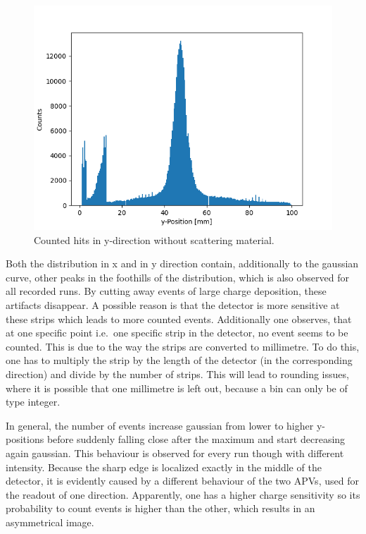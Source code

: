 \documentclass[sn-mathphys-num,iicol]{sn-jnl}
\theoremstyle{thmstyleone}
\theoremstyle{thmstyletwo}
\theoremstyle{thmstylethree}
\begin{document}
\begin{figure}
  \includegraphics[width=0.9\linewidth]{../src/elsa/finished_plots/unfiltered_noMaterial.png}
  \caption{Counted hits in y-direction without scattering material.}
  \label{fig:y_hist_notarget}
\end{figure}

Both the distribution in x and in y direction contain, additionally to the gaussian curve, other peaks in the foothills of the distribution, which is also observed for all recorded runs.
By cutting away events of large charge deposition, these artifacts disappear. 
A possible reason is that the detector is more sensitive at these strips which leads to more counted events.
Additionally one observes, that at one specific point i.e.\ one specific strip in the detector, no event seems to be counted.
This is due to the way the strips are converted to millimetre.
To do this, one has to multiply the strip by the length of the detector (in the corresponding direction) and divide by the number of strips.
This will lead to rounding issues, where it is possible that one millimetre is left out, because a bin can only be of type integer.

In general, the number of events increase gaussian from lower to higher y-positions before suddenly falling close after the maximum and start decreasing again gaussian. 
This behaviour is observed for every run though with different intensity. 
Because the sharp edge is localized exactly in the middle of the detector, it is evidently caused by a different behaviour of the two APVs, used for the readout of one direction. 
Apparently, one has a higher charge sensitivity so its probability to count events is higher than the other, which results in an asymmetrical image. 
\end{document}
